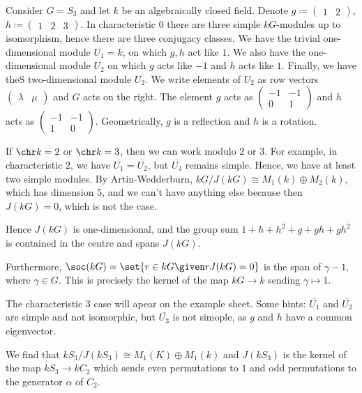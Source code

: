 Consider $G = S_3$ and let $k$ be an algebraically closed field. Denote
$g \coloneqq \begin{pmatrix}1&2\end{pmatrix}$, $h \coloneqq \begin{pmatrix}1&2&3\end{pmatrix}$.
In characteristic $0$ there are three simple $kG$-modules up to isomorphism, hence
there are three conjugacy classes. We have the trivial one-dimensional module
$U_1 = k$, on which $g, h$ act like $1$. We also have the one-dimensional module
$U_2$ on which $g$ acts like $-1$ and $h$ acts like $1$. Finally, we have theS
two-dimensional module $U_2$. We write elements of $U_2$ as row vectors
$\begin{pmatrix}\lambda&\mu\end{pmatrix}$ and $G$ acts on the right.  The element
$g$ acts as $\begin{pmatrix}-1&-1\\0&1\end{pmatrix}$ and $h$ acts as
$\begin{pmatrix}-1&-1\\1&0\end{pmatrix}$. Geometrically, $g$ is a reflection and
$h$ is a rotation.

If $\chr k = 2$ or $\chr k = 3$, then we can work modulo $2$ or $3$. For example,
in characteristic $2$, we have $\overline{U_1} = \overline{U_2}$, but $\overline{U_3}$
remains simple. Hence, we have at least two simple modules. By Artin-Wedderburn,
$kG/J(kG) \cong M_1(k)\oplus M_2(k)$, which has dimension $5$, and we can't have
anything else because then $J(kG) = 0$, which is not the case.

Hence $J(kG)$ is one-dimensional, and the group sum $1 + h + h^2 + g + gh + gh^2$ is
contained in the centre and spans $J(kG)$.

Furthermore, $\soc(kG) = \set{r \in kG\given rJ(kG) = 0}$ is the span of $\gamma  - 1$,
where $\gamma \in G$. This is precisely the kernel of the map $kG\to k$ sending
$\gamma\mapsto 1$.

The characteristic $3$ case will apear on the example sheet. Some hints:
$\overline{U_1}$ and $\overline{U_2}$ are simple and not isomorphic, but
$\overline{U_3}$ is not simople, as $g$ and $h$ have a common eigenvector.

We find that $kS_3/J(kS_3)\cong M_1(K) \oplus M_1(k)$ and
$J(kS_3)$ is the kernel of the map $kS_3\to kC_2$ which sends even permutations
to $1$ and odd permutations to the generator $\alpha$ of $C_2$.
